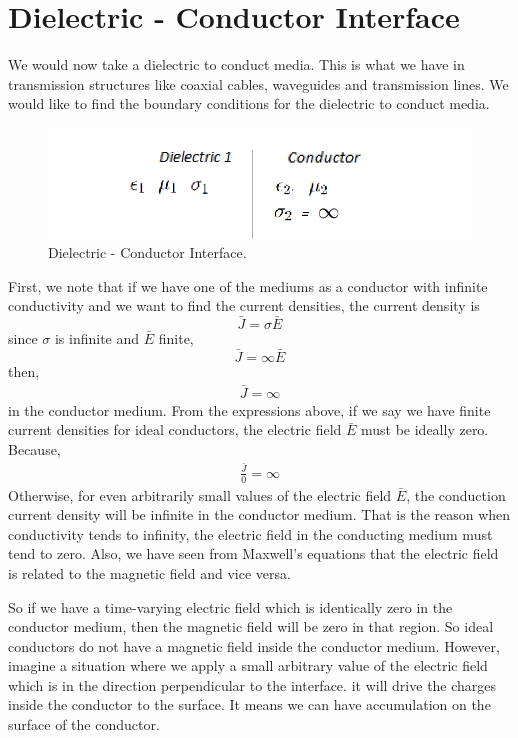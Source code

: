 \section{Dielectric - Conductor Interface}
We would now take a dielectric to conduct media. This is what we have in transmission structures like coaxial cables, waveguides and transmission lines. We would like to find the boundary conditions for the dielectric to conduct media. 
\begin{figure}[h]
\centering
\includegraphics[width=1\linewidth]{./graphics/diemedium5_2}
\caption{Dielectric - Conductor Interface.}
\end{figure}

First, we note that if we have one of the mediums as a  conductor with infinite conductivity and we want to find the current densities, the current density is 
\begin{equation}
\bar{J} = \sigma\bar{E}
\end{equation}
since $\sigma$ is infinite and $\bar{E}$ finite,
\begin{equation*}
\bar{J} = \infty\bar{E}
\end{equation*} 
then,
\begin{align*}
\bar{J} = \infty
\end{align*}
in the conductor medium. From the expressions above, if we say we have finite current densities for ideal conductors, the electric field $\bar{E}$ must be ideally zero. Because,
\begin{align*}
\frac{\bar{J}}{0} = \infty
\end{align*}
Otherwise, for even arbitrarily small values of the electric field $\bar{E}$, the conduction current density will be infinite in the conductor medium. That is the reason when conductivity tends to infinity, the electric field in the conducting medium must tend to zero. Also, we have seen from Maxwell's equations that the electric field is related to the magnetic field and vice versa. 

So if we have a time-varying electric field which is identically zero in the conductor medium, then the magnetic field will be zero in that region. So ideal conductors do not have a magnetic field inside the conductor medium. However, imagine a situation where we apply a small arbitrary value of the electric field which is in the direction perpendicular to the interface. it will drive the charges inside the conductor to the surface. It means we can have accumulation on the surface of the conductor. 

